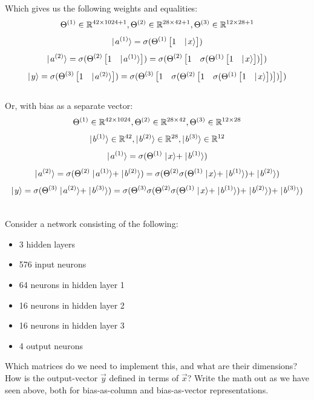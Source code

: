 Which gives us the following weights and equalities:
  $$\Theta^{(1)} \in \mathbb{R}^{42 \times 1024+1}, \Theta^{(2)} \in \mathbb{R}^{28 \times 42+1}, \Theta^{(3)} \in \mathbb{R}^{12 \times 28+1}$$
  $$\mid\! a^{(1)}\rangle = \sigma(\Theta^{(1)}\begin{bmatrix} 1 & \mid\! x\rangle\end{bmatrix})$$
  $$\mid\! a^{(2)}\rangle = \sigma(\Theta^{(2)}\begin{bmatrix} 1 & \mid\! a^{(1)}\rangle\end{bmatrix}) = \sigma(\Theta^{(2)}\begin{bmatrix} 1 & \sigma(\Theta^{(1)}\begin{bmatrix} 1 & \mid\! x\rangle\end{bmatrix})\end{bmatrix})$$
  $$\mid\! y\rangle = \sigma(\Theta^{(3)}\begin{bmatrix} 1 & \mid\! a^{(2)}\rangle\end{bmatrix}) = \sigma(\Theta^{(3)}\begin{bmatrix} 1 & \sigma(\Theta^{(2)}\begin{bmatrix} 1 & \sigma(\Theta^{(1)}\begin{bmatrix} 1 & \mid\! x\rangle\end{bmatrix})\end{bmatrix})\end{bmatrix})$$\\[-3mm]

Or, with bias as a separate vector:
  $$\Theta^{(1)} \in \mathbb{R}^{42 \times 1024}, \Theta^{(2)} \in \mathbb{R}^{28 \times 42}, \Theta^{(3)} \in \mathbb{R}^{12 \times 28}$$
  $$\mid\! b^{(1)}\rangle \in \mathbb{R}^{42}, \mid\! b^{(2)}\rangle \in \mathbb{R}^{28}, \mid\! b^{(3)}\rangle \in \mathbb{R}^{12}$$
  $$\mid\! a^{(1)}\rangle = \sigma(\Theta^{(1)}\mid\! x\rangle+\mid\! b^{(1)}\rangle)$$
  $$\mid\! a^{(2)}\rangle = \sigma(\Theta^{(2)}\mid\! a^{(1)}\rangle+\mid\! b^{(2)}\rangle) = \sigma(\Theta^{(2)}\sigma(\Theta^{(1)}\mid\! x\rangle+\mid\! b^{(1)}\rangle)+\mid\! b^{(2)}\rangle)$$
  $$\mid\! y\rangle = \sigma(\Theta^{(3)}\mid\! a^{(2)}\rangle+\mid\! b^{(3)}\rangle) = \sigma(\Theta^{(3)}\sigma(\Theta^{(2)}\sigma(\Theta^{(1)}\mid\! x\rangle+\mid\! b^{(1)}\rangle)+\mid\! b^{(2)}\rangle)+\mid\! b^{(3)}\rangle)$$

\begin{exercise}\mbox{}\\
  Consider a network consisting of the following:
  \begin{itemize}
    \item 3 hidden layers
    \item 576 input neurons
    \item 64 neurons in hidden layer 1
    \item 16 neurons in hidden layer 2
    \item 16 neurons in hidden layer 3
    \item 4 output neurons
  \end{itemize}
  Which matrices do we need to implement this, and what are their dimensions? How is the output-vector $\vec y$ defined in terms of $\vec x$? Write the math out as we have seen above, both for bias-as-column and bias-as-vector representations.
\end{exercise}

